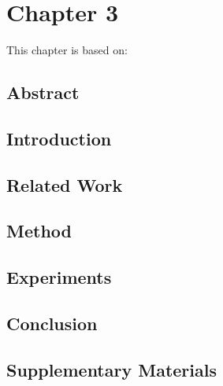 \cleardoublepage
\chapter{Chapter 3}

\label{ch:3}

\newpage
This chapter is based on: 

\section*{Abstract}

\section{Introduction}

\section{Related Work}

\section{Method}

\section{Experiments}

\section{Conclusion}


\section*{Supplementary Materials}

